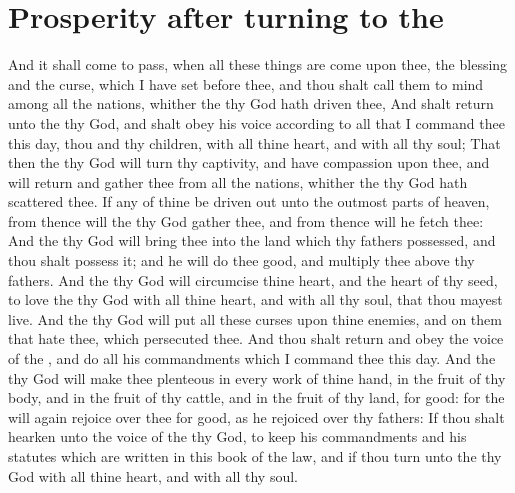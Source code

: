 \section*{Prosperity after turning to the \LORD}
\begin{biblechapter} %
\verse And it shall come to pass, when all these things are come upon thee, the blessing and the curse, which I have set before thee, and thou shalt call them to mind among all the nations, whither the \LORD thy God hath driven thee,
\verse And shalt return unto the \LORD thy God, and shalt obey his voice according to all that I command thee this day, thou and thy children, with all thine heart, and with all thy soul;
\verse That then the \LORD thy God will turn thy captivity, and have compassion upon thee, and will return and gather thee from all the nations, whither the \LORD thy God hath scattered thee.
\verse If any of thine be driven out unto the outmost parts of heaven, from thence will the \LORD thy God gather thee, and from thence will he fetch thee:
\verse And the \LORD thy God will bring thee into the land which thy fathers possessed, and thou shalt possess it; and he will do thee good, and multiply thee above thy fathers.
\verse And the \LORD thy God will circumcise thine heart, and the heart of thy seed, to love the \LORD thy God with all thine heart, and with all thy soul, that thou mayest live.
\verse And the \LORD thy God will put all these curses upon thine enemies, and on them that hate thee, which persecuted thee.
\verse And thou shalt return and obey the voice of the \LORD, and do all his commandments which I command thee this day.
\verse And the \LORD thy God will make thee plenteous in every work of thine hand, in the fruit of thy body, and in the fruit of thy cattle, and in the fruit of thy land, for good: for the \LORD will again rejoice over thee for good, as he rejoiced over thy fathers:
\verse If thou shalt hearken unto the voice of the \LORD thy God, to keep his commandments and his statutes which are written in this book of the law, and if thou turn unto the \LORD thy God with all thine heart, and with all thy soul.

\end{biblechapter}
